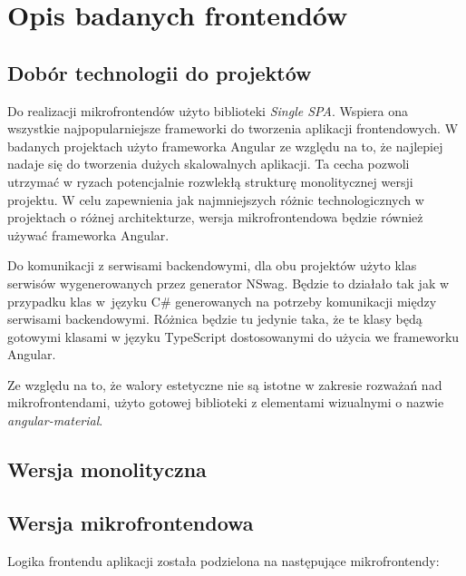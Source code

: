 \documentclass{SGGW-thesis}
\begin{document}
\chapter{Opis badanych frontendów}
  \section{Dobór technologii do projektów}
  Do realizacji mikrofrontendów użyto biblioteki \textit{Single SPA}. Wspiera ona wszystkie najpopularniejsze frameworki do tworzenia aplikacji frontendowych. W badanych projektach użyto frameworka Angular ze względu na to, że najlepiej nadaje się do tworzenia dużych skalowalnych aplikacji. Ta cecha pozwoli utrzymać w ryzach potencjalnie rozwlekłą strukturę monolitycznej wersji projektu. W celu zapewnienia jak najmniejszych różnic technologicznych w projektach o różnej architekturze, wersja mikrofrontendowa będzie również używać frameworka Angular.

  Do komunikacji z serwisami backendowymi, dla obu projektów użyto klas serwisów wygenerowanych przez generator NSwag. Będzie to działało tak jak w przypadku klas w~języku C\# generowanych na potrzeby komunikacji między serwisami backendowymi. Różnica będzie tu jedynie taka, że te klasy będą gotowymi klasami w języku TypeScript dostosowanymi do użycia we frameworku Angular.

  Ze względu na to, że walory estetyczne nie są istotne w zakresie rozważań nad mikrofrontendami, użyto gotowej biblioteki z elementami wizualnymi o nazwie \textit{angular-material}. 

  \section{Wersja monolityczna}
  \section{Wersja mikrofrontendowa}
  Logika frontendu aplikacji została podzielona na następujące mikrofrontendy:
\end{document}
